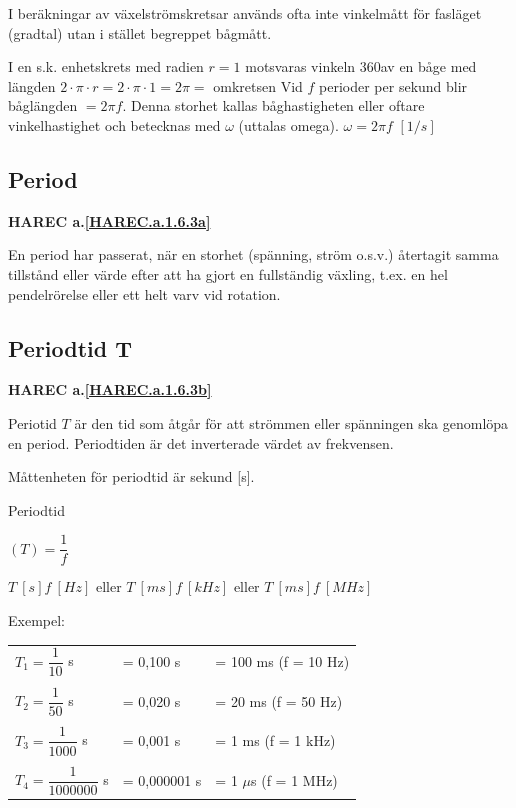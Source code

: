 I beräkningar av växelströmskretsar används ofta inte vinkelmått för fasläget
(gradtal) utan i stället begreppet bågmått.

I en s.k. enhetskrets med radien \(r = 1\) motsvaras vinkeln 360\degree av en båge med
längden \(2 \cdot \pi \cdot r= 2 \cdot \pi \cdot 1 = 2 \pi =\) omkretsen
Vid \(f\) perioder per sekund blir båglängden \(= 2\pi f\). Denna storhet
kallas båghastigheten eller oftare vinkelhastighet och betecknas med \(\omega\)
(uttalas omega).
\(\omega= 2\pi f\) \([1/s]\)

\subsection{Period}
\textbf{HAREC a.\ref{HAREC.a.1.6.3a}\label{myHAREC.a.1.6.3a}}

En period har passerat, när en storhet (spänning, ström o.s.v.) återtagit samma
tillstånd eller värde efter att ha gjort en fullständig växling, t.ex. en hel
pendelrörelse eller ett helt varv vid rotation.

\subsection{Periodtid T}
\textbf{HAREC a.\ref{HAREC.a.1.6.3b}\label{myHAREC.a.1.6.3b}}

Periotid \(T\) är den tid som åtgår för att strömmen eller spänningen ska
genomlöpa en period. Periodtiden är det inverterade värdet av frekvensen.

Måttenheten för periodtid är sekund [s].

Periodtid

\((T) = \dfrac{1}{f}\)

\(T\ [s]  f\ [Hz]\) eller
\(T\ [ms] f\ [kHz]\) eller
\(T\ [ms] f\ [MHz]\)

Exempel:

\begin{center}
\begin{tabular}{lll}
\(T_1=\dfrac{1}{10}\) s & = 0,100 s & = 100 ms (f = 10 Hz)\\
\\
\(T_2=\dfrac{1}{50}\) s & = 0,020 s & = 20 ms (f = 50 Hz)\\
\\
\(T_3=\dfrac{1}{1000}\) s & = 0,001 s & = 1 ms (f = 1 kHz)\\
\\
\(T_4=\dfrac{1}{1000000}\) s & = 0,000001 s & = 1 \(\mu\)s (f = 1 MHz)\\
\end{tabular}
\end{center}

